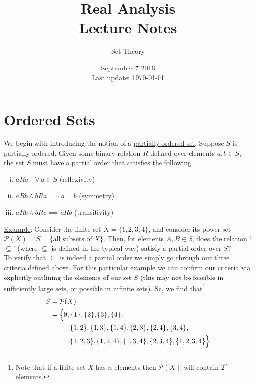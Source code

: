 \documentclass[12pt]{article}
\newlength\tindent
\renewcommand{\indent}{\hspace*{\tindent}}
\newcommand{\powerset}{\mathcal P}
\begin{document}
 
 
\title{Real Analysis\\Lecture Notes}
\author{Set Theory}
\date{September 7 2016 \\ Last update: \today{}}
\maketitle

\section{Ordered Sets}

\indent We begin with introducing the notion of a \underline{partially ordered set}. Suppose $S$ is partially ordered. Given some binary relation $R$ defined over elements $a, b \in S$, the set $S$ must have a partial order that satisfies the following
\begin{enumerate}[(i)]
	\item $aRa \quad \forall\,a\in S$ (reflexivity)
	\item $aRb \land bRa \implies a = b$ (symmetry)
	\item $aRb \land bRc \implies aRb$ (transitivity)
\end{enumerate}

\underline{Example}: Consider the finite set $X = \{1,2,3,4\}$, and consider its power set $\powerset(X) = S = \{ \text{all subsets of $X$} \}$. Then, for elements $A, B \in S$, does the relation `$\subseteq$' (where $\subseteq$ is defined in the typical way) satisfy a partial order over $S$? \\

\indent To verify that $\subseteq$ is indeed a partial order we simply go through our three criteria defined above. For this particular example we can confirm our criteria via explicitly outlining the elements of our set $S$ (this may not be feasible in sufficiently large sets, or possible in infinite sets). So, we find that\footnote{Note that if a finite set $X$ has $n$ elements then $\powerset(X)$ will contain $2^n$ elements.}
\begin{align*}
	S &= \powerset(X) \\
	&= \Big\{ \emptyset, \{1\}, \{2\}, \{3\}, \{4\}, \\
	&\hphantom{{}={--}} \{1,2\}, \{1,3\}, \{1,4\}, \{2,3\}, \{2,4\}, \{3,4\}, \\
	&\hphantom{{}={--}} \{1,2,3\}, \{1,2,4\}, \{1,3,4\}, \{2,3,4\}, \{1,2,3,4\} \Big\}
\end{align*}
\end{document}
